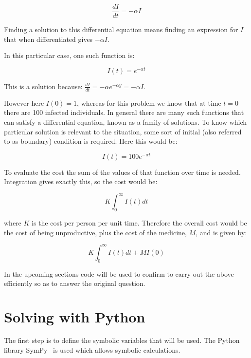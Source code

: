 \begin{equation}
    \frac{dI}{dt} = -\alpha I
\end{equation}

Finding a solution to this differential equation means finding an expression for
\(I\) that when differentiated gives \(- \alpha I\).

In this particular case, one such function is:

\begin{equation}
    I(t) = e ^ {-\alpha t}
\end{equation}

This is a solution because:
\(\frac{dI}{dt} = -\alpha e ^ {-\alpha y} = -\alpha I\).

However here \(I(0) = 1\), whereas for this problem we know that at time \(t=0\)
there are 100 infected individuals. In general there are many such functions
that can satisfy a differential equation, known as a family of solutions. To
know which particular solution is relevant to the situation, some sort of
initial (also referred to as boundary) condition is required. Here this would
be:

\begin{equation}
    I(t) = 100e ^ {-\alpha t}
\end{equation}

To evaluate the cost the sum of the values of that function over time is needed.
Integration gives exactly this, so the cost would be:

\begin{equation}
    K \int_{0}^{\infty}I(t)dt
\end{equation}

where \(K\) is the cost per person per unit time.
Therefore the overall cost would be the cost of being unproductive, plus the cost
of the medicine, \(M\), and is given by:

\begin{equation}
K \int_{0}^{\infty}I(t)dt + M I(0)
\end{equation}

In the upcoming sections code will be used to confirm to carry out the above
efficiently so as to answer the original question.

\section{Solving with Python}\label{sec:differential_equations_solving-with-python}

The first step is to define the symbolic variables that will be used.  The
Python library SymPy~\cite{meurer2017sympy} is used which allows symbolic
calculations.

